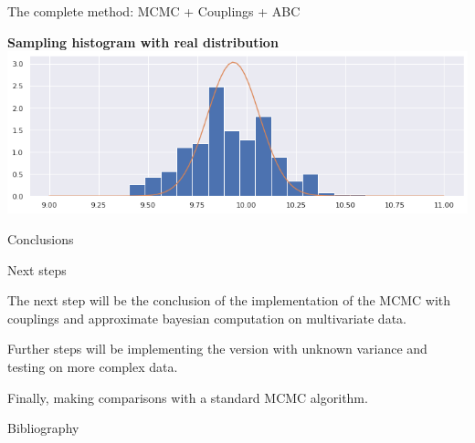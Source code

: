 \documentclass{beamer}
\begin{document}
\begin{section}{The complete method: MCMC + Couplings + ABC}
\begin{frame}
\begin{center}
			\begin{minipage}{0.63\textwidth}
				\begin{center}
					{\scriptsize \textbf{Sampling histogram with real distribution}}
					\includegraphics[width=\textwidth]{abc_coupling/histabccoupling}
				\end{center}
			\end{minipage}
		\end{center}
	\end{frame}


\end{section}


\begin{section}{Conclusions}
	
    \begin{frame}[plain]{}
		\sectionpage
	\end{frame}

	\begin{frame}{Next steps}
	
		The next step will be the conclusion of the implementation of the MCMC with couplings and approximate bayesian computation on multivariate data.
		
		\vspace{0.5 cm}
		Further steps will be implementing the version with unknown variance and testing on more complex data.
		
		Finally, making comparisons with a standard MCMC algorithm.
	\end{frame}

	\begin{frame}{Bibliography}
		\nocite{*}
		
		\tiny{  }

	

	\end{frame}
\end{section}
\end{document}
